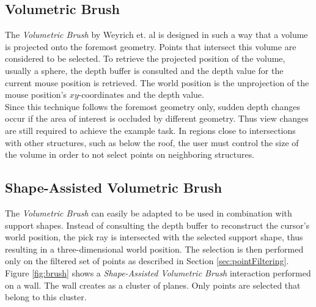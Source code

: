 \subsection{Volumetric Brush}

The \textit{Volumetric Brush} by Weyrich et. al\cite{weyrich2004post} is designed in such a way that a volume is projected onto the foremost geometry. Points that intersect this volume are considered to be selected. To retrieve the projected position of the volume, usually a sphere, the depth buffer is consulted and the depth value for the current mouse position is retrieved. The world position is the unprojection of the mouse position's $xy$-coordinates and the depth value. 
\\
Since this technique follows the foremost geometry only, sudden depth changes occur if the area of interest is occluded by different geometry. Thus view changes are still required to achieve the example task. In regions close to intersections with other structures, such as below the roof, the user must control the size of the volume in order to not select points on neighboring structures. 


\subsection{Shape-Assisted Volumetric Brush}
The \textit{Volumetric Brush} can easily be adapted to be used in combination with support shapes. Instead of consulting the depth buffer to reconstruct the cursor’s world position, the pick ray is intersected with the selected support shape, thus resulting in a three-dimensional world position. The selection is then performed only on the filtered set of points as described in Section \ref{sec:pointFiltering}. 
Figure \ref{fig:brush} shows a \textit{Shape-Assisted Volumetric Brush} interaction performed on a wall. The wall creates as a cluster of planes. Only points are selected that belong to this cluster. 

